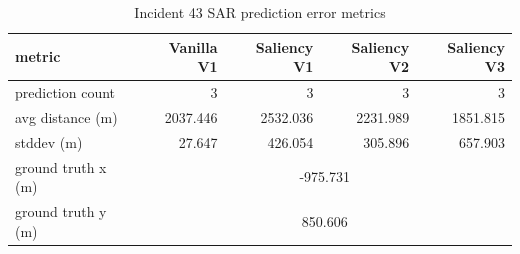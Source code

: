 \begin{table}[ht]
\centering
\caption{Incident 43 SAR prediction error metrics}
\label{tab:sar-incident-43}
\begin{tabular}{lrrrr}
\hline
metric & Vanilla V1 & Saliency V1 & Saliency V2 & Saliency V3 \\
\hline
prediction count & 3 & 3 & 3 & 3 \\
avg distance (m) & 2037.446 & 2532.036 & 2231.989 & 1851.815 \\
stddev (m) & 27.647 & 426.054 & 305.896 & 657.903 \\
ground truth x (m) & \multicolumn{4}{c}{-975.731} \\
ground truth y (m) & \multicolumn{4}{c}{850.606} \\
\hline
\end{tabular}
\end{table}
